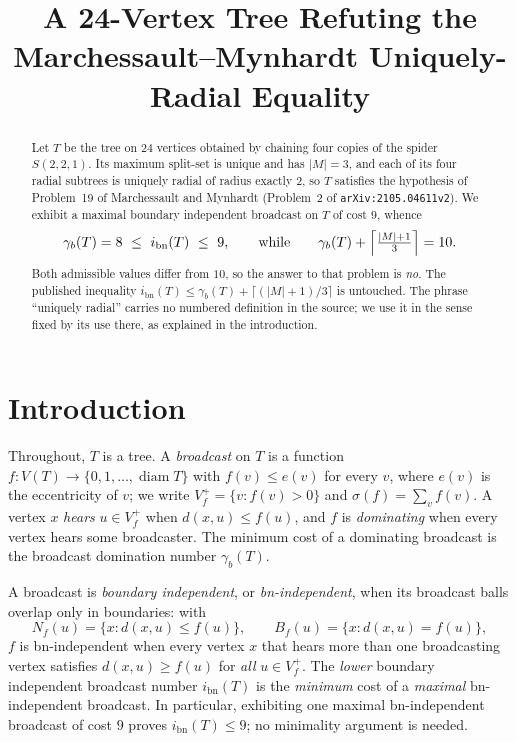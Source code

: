 \documentclass[11pt]{amsart}
\title[A 24-vertex tree and the uniquely-radial equality]
      {A 24-Vertex Tree Refuting the Marchessault--Mynhardt Uniquely-Radial Equality}
\date{}
\theoremstyle{definition}
\DeclareMathOperator{\diam}{diam}
\newcommand{\ibn}{i_{\mathrm{bn}}}
\newcommand{\gb}{\gamma_{b}}
\begin{document}
\begin{abstract}
Let $T$ be the tree on $24$ vertices obtained by chaining four copies of the
spider $S(2,2,1)$. Its maximum split-set is unique and has $|M|=3$, and each of
its four radial subtrees is uniquely radial of radius exactly $2$, so $T$
satisfies the hypothesis of Problem~19 of Marchessault and Mynhardt (Problem~2
of \texttt{arXiv:2105.04611v2}). We exhibit a maximal boundary independent
broadcast on $T$ of cost $9$, whence
\[
  \gb(T)=8\ \le\ \ibn(T)\ \le\ 9,
  \qquad\text{while}\qquad
  \gb(T)+\Bigl\lceil\tfrac{|M|+1}{3}\Bigr\rceil=10 .
\]
Both admissible values differ from $10$, so the answer to that problem is
\emph{no}. The published inequality
$\ibn(T)\le\gb(T)+\lceil(|M|+1)/3\rceil$ is untouched. The phrase ``uniquely
radial'' carries no numbered definition in the source; we use it in the sense
fixed by its use there, as explained in the introduction.
\end{abstract}

\maketitle

\section{Introduction}\label{sec:intro}

Throughout, $T$ is a tree. A \emph{broadcast} on $T$ is a function
$f\colon V(T)\to\{0,1,\dots,\diam T\}$ with $f(v)\le e(v)$ for every $v$, where
$e(v)$ is the eccentricity of $v$; we write $V_f^{+}=\{v: f(v)>0\}$ and
$\sigma(f)=\sum_{v}f(v)$. A vertex $x$ \emph{hears} $u\in V_f^{+}$ when
$d(x,u)\le f(u)$, and $f$ is \emph{dominating} when every vertex hears some
broadcaster. The minimum cost of a dominating broadcast is the broadcast
domination number $\gb(T)$.

A broadcast is \emph{boundary independent}, or \emph{bn-independent}, when its
broadcast balls overlap only in boundaries: with
\[
  N_f(u)=\{x: d(x,u)\le f(u)\},\qquad B_f(u)=\{x: d(x,u)=f(u)\},
\]
$f$ is bn-independent when every vertex $x$ that hears more than one
broadcasting vertex satisfies $d(x,u)\ge f(u)$ for \emph{all} $u\in V_f^{+}$.
The \emph{lower} boundary independent broadcast number $\ibn(T)$ is the
\emph{minimum} cost of a \emph{maximal} bn-independent broadcast. In particular,
exhibiting one maximal bn-independent broadcast of cost $9$ proves
$\ibn(T)\le 9$; no minimality argument is needed.
\end{document}
